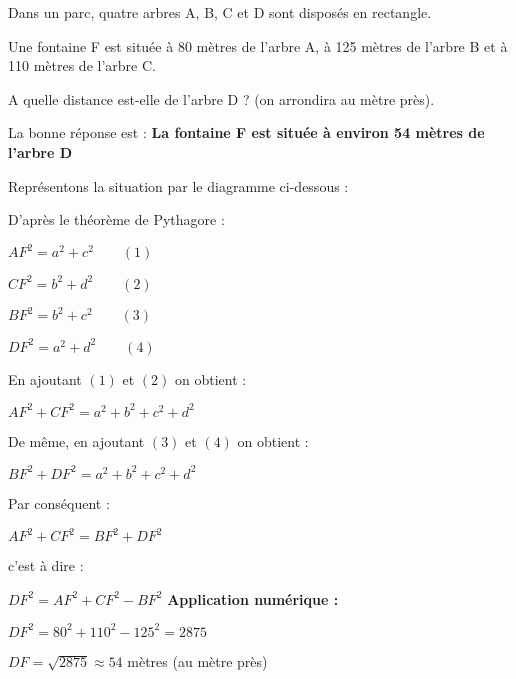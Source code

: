 
%
\begin{center}
\end{center}
\par

Dans un parc, quatre arbres A, B, C et D sont disposés en rectangle.
\par
Une fontaine F est située à 80 mètres de l'arbre A, à 125 mètres de l'arbre B et à 110 mètres de l'arbre C.
\par
A quelle distance est-elle de l'arbre D ? (on arrondira au mètre près).
\par

\begin{solution}
\begin{note}La bonne réponse est : \textbf{La fontaine F est située à environ 54 mètres de l'arbre D}\end{note}
Représentons la situation par le diagramme ci-dessous :
\begin{center}
\end{center}
D'après le théorème de Pythagore :
\par
$AF^2=a^2+c^2\qquad(1)$
\par
$CF^2=b^2+d^2\qquad(2)$
\par
$BF^2=b^2+c^2\qquad(3)$
\par
$DF^2=a^2+d^2\qquad(4)$
\par
En ajoutant $(1)$ et $(2)$ on obtient :
\par
$AF^2+CF^2=a^2+b^2+c^2+d^2$
\par
De même, en ajoutant $(3)$ et $(4)$ on obtient :
\par
$BF^2+DF^2=a^2+b^2+c^2+d^2$
\par
Par conséquent :
\par
$AF^2+CF^2=BF^2+DF^2$
\par
c'est à dire :
\par
$DF^2=AF^2+CF^2-BF^2$
\medskip
\textbf{Application numérique :}
\par
$DF^2=80^2+110^2-125^2=2875$
\par
$DF=\sqrt{2875} \approx 54$ mètres (au mètre près)
\end{solution}


